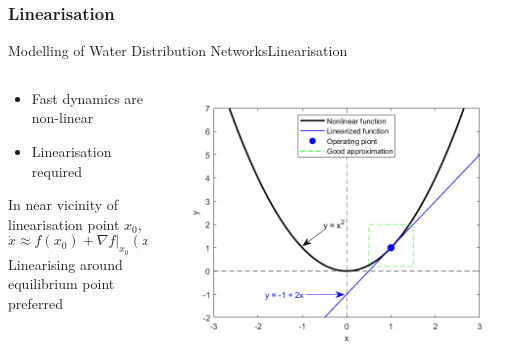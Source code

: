 \subsubsection{Linearisation}
\begin{frame}{Modelling of Water Distribution Networks}{Linearisation}
	\begin{columns}
		\begin{column}{.4\textwidth}
			\begin{itemize}
				\item Fast dynamics are non-linear
				\item Linearisation required
			\end{itemize}
			In near vicinity of linearisation point $ x_0 $,
			\begin{equation*}
				\dot{x} \approx f(x_0) + \nabla f\bigg\rvert_{x_0} (x-x_0)
			\end{equation*}
			Linearising around equilibrium point preferred
		\end{column}
		\begin{column}{.6\textwidth}\raggedleft
			\includegraphics[width=1\linewidth]{Topics/SlowDynamicsLinearisation/Graphics/Linearisation_pic.png}
		\end{column}
	\end{columns}
\end{frame}

